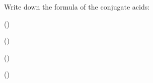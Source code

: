 \documentclass[main.tex]{subfiles}
\begin{document}
\begin{multicols*}{2}
\begin{question}[ID=\the\value{numA}]
Write down the formula of the conjugate acids:
\begin{inparaenum}[(a)]
\item  {} %
 \item  {} %
 \item  {} %
 \item  {} %
 \end{inparaenum}
\end{question}
\begin{solution}
\begin{inparaenum}[(a)]
 \item  {}  ()
 \item  {}  ()
 \item  {}  ()
 \item  {}  ()
 \end{inparaenum}
\hspace{0.1cm}\end{solution}%





\end{multicols*}
\end{document}
